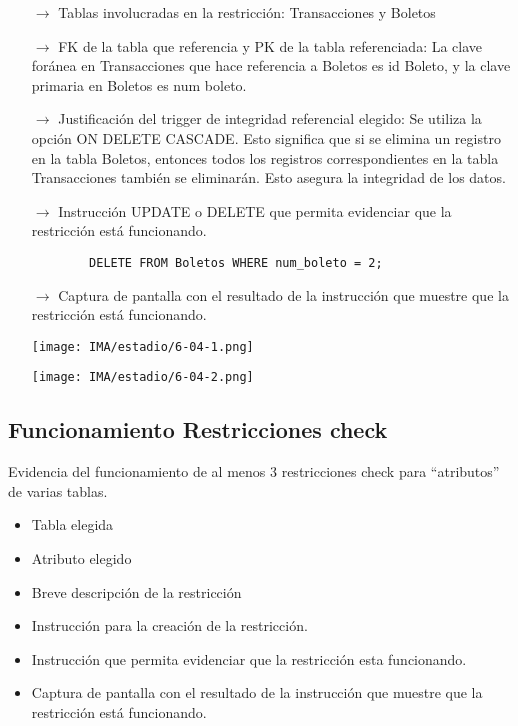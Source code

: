 \begin{itemize}
    \item[$\rightarrow$] Tablas involucradas en la restricción: Transacciones y Boletos
    \item[$\rightarrow$] FK de la tabla que referencia y PK de la tabla referenciada: La clave foránea en Transacciones que hace referencia a Boletos es id Boleto, y la clave primaria en Boletos es num boleto.
    \item[$\rightarrow$] Justificación del trigger de integridad referencial elegido: Se utiliza la opción ON DELETE CASCADE. Esto significa que si se elimina un registro en la tabla Boletos, entonces todos los registros correspondientes en la tabla Transacciones también se eliminarán. Esto asegura la integridad de los datos.
    \item[$\rightarrow$] Instrucción UPDATE o DELETE que permita evidenciar que la restricción está
    funcionando.
    \begin{verbatim}
        DELETE FROM Boletos WHERE num_boleto = 2;
    \end{verbatim}
    \item[$\rightarrow$] Captura de pantalla con el resultado de la instrucción que muestre que la restricción está
    funcionando.
    \begin{center}
        \texttt{[image: IMA/estadio/6-04-1.png]}

        \texttt{[image: IMA/estadio/6-04-2.png]}
    \end{center}
\end{itemize}


\subsection{Funcionamiento Restricciones check}

Evidencia del funcionamiento de al menos 3 restricciones check para “atributos” de varias
tablas.

\begin{itemize}
    \item Tabla elegida
    \item Atributo elegido
    \item Breve descripción de la restricción
    \item Instrucción para la creación de la restricción.
    \item Instrucción que permita evidenciar que la restricción esta funcionando.
    \item Captura de pantalla con el resultado de la instrucción que muestre que la restricción está
    funcionando.
\end{itemize}






